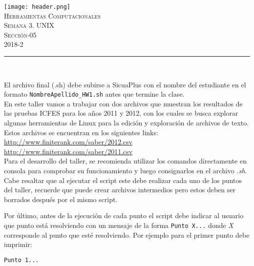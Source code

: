 \documentclass[letterpaper,10pt,onecolumn]{exam}
\begin{document}
\begin{center}

\texttt{[image: header.png]}\\[0.5cm]

\textsc{\huge Herramientas Computacionales}\\[0.1cm]

\Large \textsc{Semana 3. UNIX}\\
\Large \textsc{Sección-05}\\
\Large \textsc{2018-2}\\[0.7cm]

\end{center}


\noindent\rule{\textwidth}{1pt}\\[-0.1cm]

\addtocounter{mysection}{1}

El archivo final (.sh) debe subirse a SicuaPlus con el nombre del estudiante en el formato \verb|NombreApellido_HW1.sh| antes que termine la clase.\\


En este taller vamos a trabajar con dos archivos que muestran los resultados de las pruebas ICFES para los años 2011 y 2012, con los cuales se busca explorar algunas herramientas de Linux para la edición y exploración de archivos de texto. Estos archivos se encuentran en los siguientes links:\\ 
\url{http://www.finiterank.com/saber/2012.csv}\\
\url{http://www.finiterank.com/saber/2011.csv}\\

Para el desarrollo del taller, se recomienda utilizar los comandos directamente en consola para comprobar su funcionamiento y luego consignarlos en el archivo \textit{.sh}. Cabe resaltar que al ejecutar el script este debe realizar cada uno de los puntos del taller, recuerde que puede crear archivos intermedios pero estos deben ser borrados después por el mismo script.

Por último, antes de la ejecución de cada punto el script debe indicar al usuario que punto está resolviendo con un mensaje de la forma \verb|Punto X...| donde \textit{X} corresponde al punto que esté resolviendo. Por ejemplo para el primer punto debe imprimir:

\centering \verb|Punto 1...|\\[0.7cm]
\end{document}

